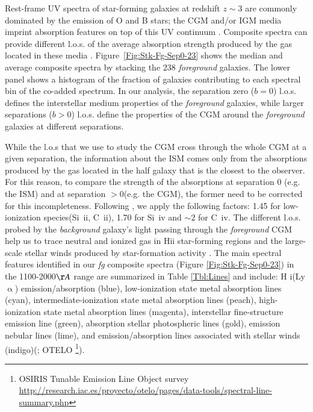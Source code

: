 \documentclass[longauth]{aa}
\begin{document}
Rest-frame UV spectra of star-forming galaxies at redshift $z\sim3$ are
commonly dominated by the emission of O and B stars; the CGM and/or IGM media
imprint absorption features on top of this UV continuum
\citep{Sargent80,Bergeron86,Bergeron91,Lanzetta95}. Composite spectra can
provide different l.o.s. of the average absorption strength produced by the
gas located in these media
\citep{Adelberger05a,Shapley03}. Figure~\ref{Fig:Stk-Fg-Sep0-23} shows the
median and average composite spectra by stacking the 238 \textit
{foreground} galaxies. The lower panel shows a histogram of the fraction of
galaxies contributing to each spectral bin of the co-added spectrum. In our
analysis, the separation zero ($b=0$) l.o.s. defines the interstellar medium
properties of the \textit{foreground} galaxies, while larger separations
($b>0$) l.o.s. define the properties of the CGM around the
\textit{foreground} galaxies at different separations.

While the l.o.s that we use to study the CGM cross through the whole CGM at a
given separation, the information about the ISM comes only from the
absorptions produced by the gas located in the half galaxy that is the
closest to the observer. For this reason, to compare the strength of the
absorptions at separation 0 (e.g. the ISM) and at separation $>0$(e.g. the
CGM), the former need to be corrected for this incompleteness.
Following \cite{Steidel10}, we apply the following factors: 1.45 for
low-ionization species(Si \,{\sc ii}, C \,{\sc ii}), 1.70 for Si \,{\sc iv}
and $\sim2$ for C \,{\sc iv}. The different l.o.s. probed by the \textit
{background} galaxy's light passing through the \textit{foreground} CGM help
us to trace neutral and ionized gas in H{\sc ii} star-forming regions and the
large-scale stellar winds produced by star-formation activity \citep
{Shapley03}. The main spectral features identified in our \textit
{fg} composite spectra (Figure \ref{Fig:Stk-Fg-Sep0-23}) in the
1100-2000$\AA$ range are summarized in Table \ref{Tbl:Lines} and include: H
{\sc i}(Ly$\upalpha$) emission/absorption (blue), low-ionization state metal
absorption lines (cyan), intermediate-ionization state metal absorption lines
(peach), high-ionization state metal absorption lines (magenta), interstellar
fine-structure emission line (green), absorption stellar photospheric lines
(gold), emission nebular lines (lime), and emission/absorption lines
associated with stellar winds (indigo)(\citealt
{Halliday08,LeFevre15,Shapley03}; OTELO 
\footnote{OSIRIS Tunable Emission Line Object survey \url{http://research.iac.es/proyecto/otelo/pages/data-tools/spectral-line-summary.php}}).
\end{document}
